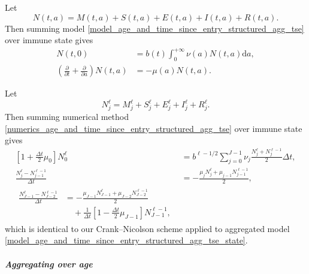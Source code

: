 \documentclass[USenglish]{article}
\newcommand{\md}{\mathrm{d}}
\begin{document}
Let
\begin{equation}
  N(t, a)
  = M(t, a) + S(t, a) + E(t, a) + I(t, a) + R(t, a).
\end{equation}
Then summing model
\eqref{model_age_and_time_since_entry_structured_agg_tse} over immune
state gives
\begin{subequations}
  \label{model_age_and_time_since_entry_structured_agg_tse_state}
  \begin{align}
    N(t, 0)
    &= b(t) \int_0^{+\infty} \nu(a) N(t, a) \md a,
    \\
    \left(\frac{\partial}{\partial t}
      + \frac{\partial}{\partial a}\right)
    N(t, a)
    &= - \mu(a) N(t, a).
  \end{align}
\end{subequations}

Let
\begin{equation}
  N_j^{\ell}
  = M_j^{\ell} + S_j^{\ell} + E_j^{\ell} + I_j^{\ell} + R_j^{\ell}.
\end{equation}
Then summing numerical method
\eqref{numerics_age_and_time_since_entry_structured_agg_tse} over
immune state gives
\begin{subequations}
  \label{numerics_age_and_time_since_entry_structured_agg_tse_state}
  \begin{align}
    \left[1 + \frac{\Delta t}{2} \mu_0\right] N_0^{\ell}
    &= b^{\ell - 1 / 2}
    \sum_{j = 0}^{J - 1} \nu_j \frac{N_j^{\ell} + N_j^{\ell - 1}}{2}
    \Delta t,
    \\
    \frac{N_j^{\ell} - N_{j - 1}^{\ell - 1}}{\Delta t}
    &= - \frac{\mu_j N_j^{\ell} + \mu_{j - 1} N_{j - 1}^{\ell - 1}}{2},
    \\
    \begin{split}
      \frac{N_{J - 1}^{\ell} - N_{J - 2}^{\ell - 1}}{\Delta t}
      &= - \frac{\mu_{J - 1} N_{J - 1}^{\ell}
        + \mu_{J - 2} N_{J - 2}^{\ell - 1}}
      {2}
      \\ & \quad {}
      + \frac{1}{\Delta t} \left[
        1 - \frac{\Delta t}{2} \mu_{J - 1}
      \right] N_{J - 1}^{\ell - 1},
    \end{split}
  \end{align}
\end{subequations}
which is identical to our Crank--Nicolson scheme applied to aggregated
model \eqref{model_age_and_time_since_entry_structured_agg_tse_state}.


\subparagraph{Aggregating over age}
\end{document}
